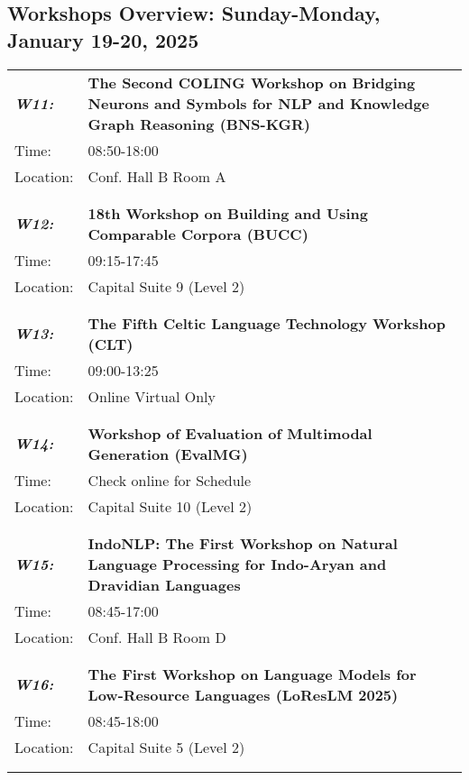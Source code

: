 \subsection{Workshops Overview: Sunday-Monday, January 19-20, 2025}
\begin{longtable}{p{15mm}p{100mm}}
\emph{\textbf{W11:}} & \textbf{The Second COLING Workshop on Bridging Neurons and Symbols for NLP and Knowledge Graph Reasoning (BNS-KGR)} \\
Time: & 08:50-18:00 \\
Location: & Conf. Hall B Room A \\\\
\hline\\
\emph{\textbf{W12:}} & \textbf{18th Workshop on Building and Using Comparable Corpora (BUCC)} \\
Time: & 09:15-17:45 \\
Location: & Capital Suite 9 (Level 2) \\\\
\hline\\
\emph{\textbf{W13:}} & \textbf{The Fifth Celtic Language Technology Workshop (CLT)} \\
Time: & 09:00-13:25 \\
Location: & Online Virtual Only \\\\
\hline\\
\emph{\textbf{W14:}} & \textbf{Workshop of Evaluation of Multimodal Generation (EvalMG)} \\
Time: & Check online for Schedule \\
Location: & Capital Suite 10 (Level 2) \\\\
\hline\\
\emph{\textbf{W15:}} & \textbf{IndoNLP: The First Workshop on Natural Language Processing for Indo-Aryan and Dravidian Languages} \\
Time: & 08:45-17:00 \\
Location: & Conf. Hall B Room D \\\\
\hline\\
\emph{\textbf{W16:}} & \textbf{The First Workshop on Language Models for Low-Resource Languages (LoResLM 2025)} \\
Time: & 08:45-18:00 \\
Location: & Capital Suite 5 (Level 2) \\\\
\hline\\

\end{longtable}
